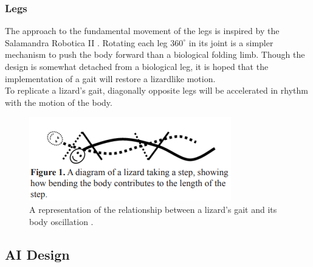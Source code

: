 \documentclass{article}
\begin{document}
\subsubsection{Legs}
\label{sec:Leg Movement}
The approach to the fundamental movement of the legs is inspired by the Salamandra Robotica II . Rotating each leg $360^\circ$ in its joint is a simpler mechanism to push the body forward than a biological folding limb. Though the design is somewhat detached from a biological leg, it is hoped that the implementation of a gait will restore a lizardlike motion.\\
To replicate a lizard's gait, diagonally opposite legs will be accelerated in rhythm with the motion of the body. 
\begin{figure}[H]
\centering
\includegraphics[scale=1]{lizardGait}
\caption{A representation of the relationship between a lizard's gait and its body oscillation \citep{reptileLocomotion}.}
\end{figure}

\newpage
\subsection{AI Design}
\end{document}
